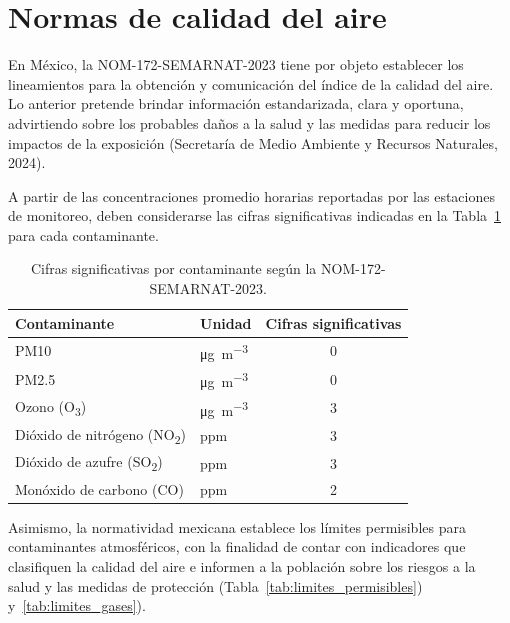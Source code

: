 \section{Normas de calidad del aire}
En México, la NOM-172-SEMARNAT-2023 tiene por objeto establecer los
lineamientos para la obtención y comunicación del índice de la calidad
del aire. Lo anterior pretende brindar información estandarizada, clara
y oportuna, advirtiendo sobre los probables daños a la salud y las
medidas para reducir los impactos de la exposición (Secretaría de Medio
Ambiente y Recursos Naturales, 2024).

A partir de las concentraciones promedio horarias reportadas por las
estaciones de monitoreo, deben considerarse las cifras significativas
indicadas en la Tabla~\ref{tab:cifras_significativas} para cada
contaminante.

\begin{table}[h!]
\centering
\caption{Cifras significativas por contaminante según la
NOM-172-SEMARNAT-2023.}
\label{tab:cifras_significativas}
\begin{tabular}{llc}
\toprule
\textbf{Contaminante} & \textbf{Unidad} &
\textbf{Cifras significativas} \\
\midrule
PM10 & \si{\micro\gram\per\cubic\meter} & 0 \\
PM2.5 & \si{\micro\gram\per\cubic\meter} & 0 \\
Ozono (O\textsubscript{3}) & \si{\micro\gram\per\cubic\meter} & 3 \\
Dióxido de nitrógeno (NO\textsubscript{2}) & ppm & 3 \\
Dióxido de azufre (SO\textsubscript{2}) & ppm & 3 \\
Monóxido de carbono (CO) & ppm & 2 \\
\bottomrule
\end{tabular}
\end{table}

Asimismo, la normatividad mexicana establece los límites permisibles
para contaminantes atmosféricos, con la finalidad de contar con
indicadores que clasifiquen la calidad del aire e informen a la
población sobre los riesgos a la salud y las medidas de protección
(Tabla~\ref{tab:limites_permisibles}) y~\ref{tab:limites_gases}).

